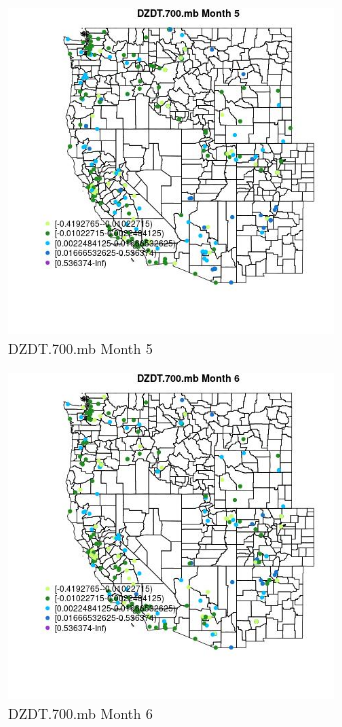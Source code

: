 \begin{figure} 
\centering  
\includegraphics[width=0.77\textwidth]{Code_Outputs/Report_ML_input_PM25_Step4_part_e_de_duplicated_aveswNAs_MapObsMo5DZDT700mb.jpg} 
\caption{\label{fig:Report_ML_input_PM25_Step4_part_e_de_duplicated_aveswNAsMapObsMo5DZDT700mb}DZDT.700.mb Month 5} 
\end{figure} 
 

\begin{figure} 
\centering  
\includegraphics[width=0.77\textwidth]{Code_Outputs/Report_ML_input_PM25_Step4_part_e_de_duplicated_aveswNAs_MapObsMo6DZDT700mb.jpg} 
\caption{\label{fig:Report_ML_input_PM25_Step4_part_e_de_duplicated_aveswNAsMapObsMo6DZDT700mb}DZDT.700.mb Month 6} 
\end{figure} 
 

